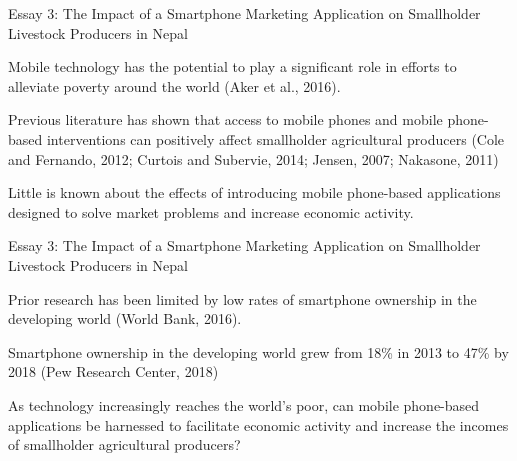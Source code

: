 \documentclass[aspectratio=169]{beamer}
\newenvironment{wideitemize}{\itemize\addtolength{\itemsep}{10pt}}{\enditemize}
\begin{document}
\begin{frame}{Essay 3: The Impact of a Smartphone Marketing Application on Smallholder Livestock Producers in Nepal}

    \begin{wideitemize}
        \item Mobile technology has the potential to play a significant role in efforts to alleviate poverty
around the world (Aker et al., 2016).
        \item Previous literature has shown that access to mobile phones and mobile phone-based interventions can positively affect smallholder agricultural producers (Cole and Fernando, 2012; Curtois and
        Subervie, 2014; Jensen, 2007; Nakasone, 2011)
        \item Little is known about the effects of introducing mobile phone-based applications designed to solve market problems and increase economic activity.
    \end{wideitemize}
\end{frame}

\begin{frame}{Essay 3: The Impact of a Smartphone Marketing Application on Smallholder Livestock Producers in Nepal}

    \begin{wideitemize}
        \item Prior research has been limited by low rates of smartphone ownership in the developing world (World Bank, 2016).
        \item Smartphone ownership in the developing world grew from 18\% in 2013 to 47\% by 2018 (Pew Research Center, 2018)
        \item As technology increasingly reaches the world’s poor, can mobile phone-based applications be harnessed to facilitate economic activity and increase the incomes of smallholder agricultural producers?
    \end{wideitemize}
\end{frame}
\end{document}
